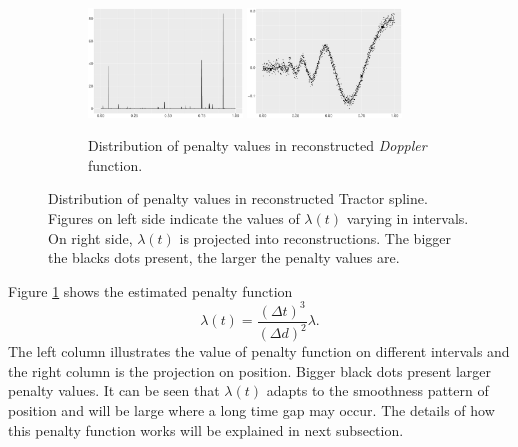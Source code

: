 \begin{figure}\ContinuedFloat
    \centering 
    \begin{subfigure}{\textwidth}
    \centering
    \includegraphics[width=0.45\textwidth]{Chapters/02TractorSplineTheory/plot/ggplot/ggDopplerPenaltyBar.pdf}
    \includegraphics[width=0.45\textwidth]{Chapters/02TractorSplineTheory/plot/ggplot/ggDopplerPenaltyLine.pdf}
    \caption{Distribution of penalty values in reconstructed \textit{Doppler} function.}
    \end{subfigure}
\caption{Distribution of penalty values in reconstructed Tractor spline. Figures on left side indicate the values of $\lambda(t)$ varying in intervals. On right side, $\lambda(t)$ is projected into reconstructions. The bigger the blacks dots present, the larger the penalty values are.}\label{numpenalty}
 \end{figure}


Figure \ref{numpenalty} shows the estimated penalty function
\begin{equation}
\lambda(t)=\frac{(\Delta t)^3}{(\Delta d)^2}\lambda.
\end{equation}
The left column illustrates the value of penalty function on different intervals and the right column is the projection on position. Bigger black dots present larger penalty values. It can be seen that $\lambda(t)$ adapts to the smoothness pattern of position and will be large where a long time gap may occur. The details of how this penalty function works will be explained in next subsection.



